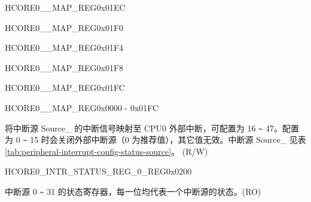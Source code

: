 \begin{register}{H}{CORE0\_\_MAP\_REG}{0x01EC}\label{regdesc:CORE0H264DMA2DINCH3INTMAPREG}
\end{register}\vspace{-3em}


\begin{register}{H}{CORE0\_\_MAP\_REG}{0x01F0}\label{regdesc:CORE0H264DMA2DINCH4INTMAPREG}
\end{register}\vspace{-3em}


\begin{register}{H}{CORE0\_\_MAP\_REG}{0x01F4}\label{regdesc:CORE0H264DMA2DINCH5INTMAPREG}
\end{register}\vspace{-3em}


\begin{register}{H}{CORE0\_\_MAP\_REG}{0x01F8}\label{regdesc:CORE0H264REGINTMAPREG}
\end{register}\vspace{-3em}


\begin{register}{H}{CORE0\_\_MAP\_REG}{0x01FC}\label{regdesc:CORE0ASSISTDEBUGINTMAPREG}
\end{register}\vspace{-3em}

\begin{register}{H}{CORE0\_\_MAP\_REG}{0x0000 - 0x01FC}\label{regdesc:CORE0SOURCEregindexYMAPREG}
%
%
\regnewline%
\begin{regdesc}\begin{reglist}
\label{fielddesc:CORE0SOURCEregindexYMAP}\item [CORE0\_SOURCE\_\regindex{Y}\_MAP] 将中断源 Source\_ 的中断信号映射至 CPU0 外部中断，可配置为 16 \verb+~+ 47。配置为 0 \verb+~+ 15 时会关闭外部中断源（0 为推荐值），其它值无效。中断源 Source\_ 见表 \ref{tab:peripheral-interrupt-config-status-source}。  (R/W)
\end{reglist}\end{regdesc}
\end{register}



\begin{register}{H}{CORE0\_INTR\_STATUS\_REG\_0\_REG}{0x0200}\label{regdesc:CORE0INTRSTATUSREG0REG}
%
\regnewline%
\begin{regdesc}\begin{reglist}
\label{fielddesc:CORE0INTRSTATUS0}\item [CORE0\_INTR\_STATUS\_0] 中断源 0 \verb+~+ 31 的状态寄存器，每一位均代表一个中断源的状态。(RO)
\end{reglist}\end{regdesc}
\end{register}


